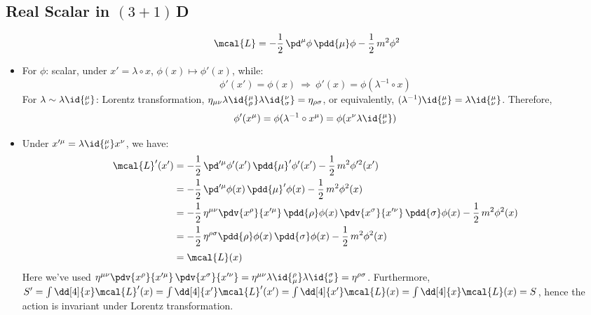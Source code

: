 \documentclass[a4paper,10pt]{article}
\begin{document}
\subsection{Real Scalar in $(3+1)$\,D}
	\vspace{-.8\baselineskip}
	\begin{equation}
		\mcal{L}
		= -\frac{1}{2}\,
			\pd^\mu\phi\,
			\pdd{\mu}\phi
		-\frac{1}{2}\,m^2\phi^2
	\end{equation}
	\begin{itemize}
	\item For $\phi$: scalar, under $
		x' = \lambda\circ x
	$, $\phi(x)\mapsto \phi'(x)$, while:
	\begin{equation}
		\phi'(x') = \phi(x)
		\ \Longrightarrow\ %
		\phi'(x) = \phi(\lambda^{-1}\circ x)
	\end{equation}
	For $\lambda\sim \lambda\id{^\mu_\nu}$: Lorentz transformation, $
		\eta_{\mu\nu}
			\lambda\id{^\mu_\rho}
			\lambda\id{^\nu_\sigma}
		= \eta_{\rho\sigma}
	$, or equivalently, $
		(\lambda^{-1})\id{^\mu_\nu}
		= \lambda\id{_\nu^\mu}
	$. Therefore,
	\begin{equation}
		\phi'(x^\mu) = \phi(\lambda^{-1}\circ x^\mu)
		= \phi(x^\nu\lambda\id{_\nu^\mu})
	\end{equation}
	
	\item Under $
		x'^\mu = \lambda\id{^\mu_\nu} x^\nu
	$, we have:
	\begin{equation}
	\begin{aligned}
		\mcal{L}'(x')
		&= - \frac{1}{2}\,
			\pd'^\mu\phi'(x')\,
			\pdd{\mu}'\phi'(x')
		- \frac{1}{2}\,m^2\phi'^2(x') \\
		&= - \frac{1}{2}\,
			\pd'^\mu\phi(x)\,
			\pdd{\mu}'\phi(x)
		- \frac{1}{2}\,m^2\phi^2(x) \\
		&= - \frac{1}{2}\,
			\eta^{\mu\nu}
			\pdv{x^\rho}{x'^\mu}\,
			\pdd{\rho}\phi(x)\,
			\pdv{x^\sigma}{x'^\nu}\,
			\pdd{\sigma}\phi(x)
		- \frac{1}{2}\,m^2\phi^2(x) \\
		&= - \frac{1}{2}\,
			\eta^{\rho\sigma}
			\pdd{\rho}\phi(x)\,
			\pdd{\sigma}\phi(x)
		- \frac{1}{2}\,m^2\phi^2(x) \\[.5ex]
		&= \mcal{L}(x)
	\end{aligned}
	\end{equation}
	Here we've used $
		\eta^{\mu\nu}
		\pdv{x^\rho}{x'^\mu}\,
		\pdv{x^\sigma}{x'^\nu}
		= \eta^{\mu\nu}
			\lambda\id{_\mu^\rho}
			\lambda\id{_\nu^\sigma}
		= \eta^{\rho\sigma}
	$. Furthermore, $
		S' = \int \dd[4]{x} \mcal{L}'(x)
		= \int \dd[4]{x'} \mcal{L}'(x')
		= \int \dd[4]{x'} \mcal{L}(x)
		= \int \dd[4]{x} \mcal{L}(x)
		= S
	$, hence the action is invariant under Lorentz transformation. 
	

\end{itemize}
\end{document}
